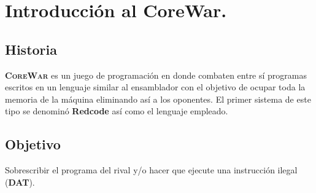 \newpage
\section{Introducción al CoreWar.}

\subsection{Historia}
\noindent
\textsc{\textbf{CoreWar}} es un juego de programación en donde combaten entre sí programas escritos en un lenguaje similar al ensamblador con el objetivo de ocupar toda la memoria de la máquina eliminando así a los oponentes.
\newline El primer sistema de este tipo se denominó \textbf{Redcode} así como el lenguaje empleado.

\subsection{Objetivo}
\noindent
Sobrescribir el programa del rival y/o hacer que ejecute una instrucción ilegal (\textbf{\textsc{DAT}}).

